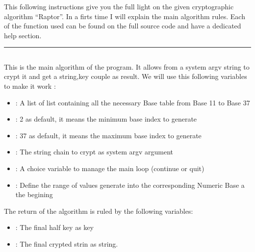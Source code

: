 \documentclass[letterpaper,10pt,english]{sphinxmanual}
\begin{document}
\sphinxAtStartPar
This following instructions give you the full light on the given cryptographic algorithm “Raptor”.
In a firts time I will explain the main algorithm rules. Each of the function used can be found on the
full source code and have a dedicated help section.

\sphinxAtStartPar
{}


\bigskip\hrule\bigskip



\subsection{}
\label{\detokenize{Description of Crypterv3:algorithm}}
\sphinxAtStartPar
This is the main algorithm of the program.
It allows from a system argv string to crypt it and get a string,key couple as result.
We will use this following variables to make it work :
\begin{itemize}
\item {} 
\sphinxAtStartPar
{} : A list of list containing all the necessary Base table from Base 11 to Base 37

\item {} 
\sphinxAtStartPar
{} : 2 as default, it means the minimum base index to generate

\item {} 
\sphinxAtStartPar
{} :  37 as default, it means the maximum base index to generate

\item {} 
\sphinxAtStartPar
{} : The string chain to crypt as system argv argument

\item {} 
\sphinxAtStartPar
{} : A choice variable to manage the main loop (continue or quit)

\item {} 
\sphinxAtStartPar
{} : Define the range of values generate into the corresponding Numeric Base a the begining

\end{itemize}

\sphinxAtStartPar
The return of the algorithm is ruled by the following variables:
\begin{itemize}
\item {} 
\sphinxAtStartPar
{} : The final half key as key

\item {} 
\sphinxAtStartPar
{} : The final crypted strin as string.

\end{itemize}
\end{document}
